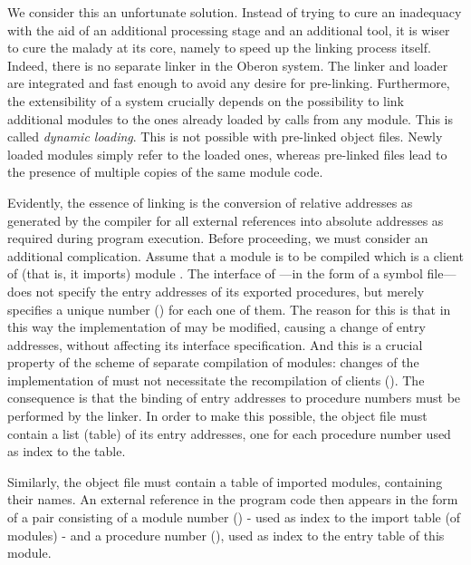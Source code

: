 We consider this an unfortunate solution. Instead of trying to cure an inadequacy with the aid of an additional processing stage and an additional tool, it is wiser to cure the malady at its core, namely to speed up the linking process itself. Indeed, there is no separate linker in the Oberon system. The linker and loader are integrated and fast enough to avoid any desire for pre-linking. Furthermore, the extensibility of a system crucially depends on the possibility to link additional modules to the ones already loaded by calls from any module. This is called \emph{dynamic loading}. This is not possible with pre-linked object files. Newly loaded modules simply refer to the loaded ones, whereas pre-linked files lead to the presence of multiple copies of the same module code.


Evidently, the essence of linking is the conversion of relative addresses as generated by the compiler for all external references into absolute addresses as required during program execution. Before proceeding, we must consider an additional complication. Assume that a module  is to be compiled which is a client of (that is, it imports) module . The interface of ---in the form of a symbol file---does not specify the entry addresses of its exported procedures, but merely specifies a unique number () for each one of them. The reason for this is that in this way the implementation of  may be modified, causing a change of entry addresses, without affecting its interface specification. And this is a crucial property of the scheme of separate compilation of modules: changes of the implementation of  must not necessitate the recompilation of clients (). The consequence is that the binding of entry addresses to procedure numbers must be performed by the linker. In order to make this possible, the object file must contain a list (table) of its entry addresses, one for each procedure number used as index to the table.

Similarly, the object file must contain a table of imported modules, containing their names. An external reference in the program code then appears in the form of a pair consisting of a module number () - used as index to the import table (of modules) - and a procedure number (), used as index to the entry table of this module.

